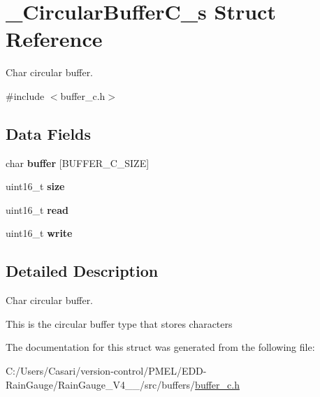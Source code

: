 \hypertarget{struct___circular_buffer_c__s}{}\section{\+\_\+\+Circular\+Buffer\+C\+\_\+s Struct Reference}
\label{struct___circular_buffer_c__s}


Char circular buffer.  




{\ttfamily \#include $<$buffer\+\_\+c.\+h$>$}

\subsection*{Data Fields}
\begin{DoxyCompactItemize}
\item 
\hypertarget{struct___circular_buffer_c__s_aa23c72630131057d9b6884c163574d57}{}char {\bfseries buffer} \mbox{[}B\+U\+F\+F\+E\+R\+\_\+\+C\+\_\+\+S\+I\+Z\+E\mbox{]}\label{struct___circular_buffer_c__s_aa23c72630131057d9b6884c163574d57}

\item 
\hypertarget{struct___circular_buffer_c__s_aaba88b24a21a6c70c895c0d55f4a69a0}{}uint16\+\_\+t {\bfseries size}\label{struct___circular_buffer_c__s_aaba88b24a21a6c70c895c0d55f4a69a0}

\item 
\hypertarget{struct___circular_buffer_c__s_a17fc9132ed0f45e5ef7a59e6a93abeb0}{}uint16\+\_\+t {\bfseries read}\label{struct___circular_buffer_c__s_a17fc9132ed0f45e5ef7a59e6a93abeb0}

\item 
\hypertarget{struct___circular_buffer_c__s_abac7c895b71c1b4d5b21beabca7ea63c}{}uint16\+\_\+t {\bfseries write}\label{struct___circular_buffer_c__s_abac7c895b71c1b4d5b21beabca7ea63c}

\end{DoxyCompactItemize}


\subsection{Detailed Description}
Char circular buffer. 

This is the circular buffer type that stores characters 

The documentation for this struct was generated from the following file\+:\begin{DoxyCompactItemize}
\item 
C\+:/\+Users/\+Casari/version-\/control/\+P\+M\+E\+L/\+E\+D\+D-\/\+Rain\+Gauge/\+Rain\+Gauge\+\_\+\+V4\+\_\+\_/src/buffers/\hyperlink{buffer__c_8h}{buffer\+\_\+c.\+h}\end{DoxyCompactItemize}
